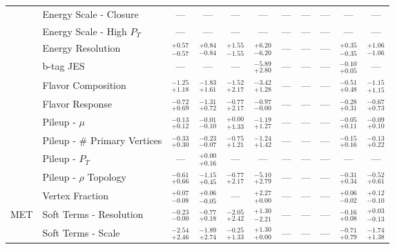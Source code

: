 \begin{tabular}{|cl||ccccccc|c||c|}
\cline{2-11}
&Energy Scale - Closure  & --- & --- & --- & --- & --- & --- & --- & --- & ---\\ 
\cline{2-11}
&Energy Scale - High $P_{T}$ & --- & --- & --- & --- & --- & --- & --- & --- & ---\\ 
\cline{2-11}
&Energy Resolution &  $^{+0.57}_{-0.57}$  &  $^{+0.84}_{-0.84}$  &  $^{+1.55}_{-1.55}$  &  $^{+6.20}_{-6.20}$  & --- & --- & --- &  $^{+0.35}_{-0.35}$  &  $^{+1.06}_{-1.06}$ \\ 
\cline{2-11}
&b-tag JES & --- & --- & --- &  $^{-5.89}_{+2.80}$  & --- & --- & --- &  $^{-0.10}_{+0.05}$  & ---\\ 
\cline{2-11}
&Flavor Composition &  $^{-1.25}_{+1.18}$  &  $^{-1.83}_{+1.61}$  &  $^{-1.52}_{+2.17}$  &  $^{-3.42}_{+1.28}$  & --- & --- & --- &  $^{-0.51}_{+0.48}$  &  $^{-1.15}_{+1.15}$ \\ 
\cline{2-11}
&Flavor Response &  $^{-0.72}_{+0.69}$  &  $^{-1.31}_{+0.72}$  &  $^{-0.77}_{+2.17}$  &  $^{-0.97}_{-0.00}$  & --- & --- & --- &  $^{-0.28}_{+0.31}$  &  $^{-0.67}_{+0.73}$ \\ 
\cline{2-11}
&Pileup - $\mu$ &  $^{-0.13}_{+0.12}$  &  $^{-0.01}_{-0.10}$  &  $^{+0.00}_{+1.33}$  &  $^{-1.19}_{+1.27}$  & --- & --- & --- &  $^{-0.05}_{+0.11}$  &  $^{-0.09}_{+0.10}$ \\ 
\cline{2-11}
&Pileup - \# Primary Vertices &  $^{-0.33}_{+0.30}$  &  $^{-0.23}_{-0.07}$  &  $^{-0.75}_{+1.21}$  &  $^{-1.24}_{+1.42}$  & --- & --- & --- &  $^{-0.15}_{+0.16}$  &  $^{-0.13}_{+0.22}$ \\ 
\cline{2-11}
&Pileup -  $P_{T}$ & --- &  $^{+0.00}_{+0.16}$  & --- & --- & --- & --- & --- & --- & ---\\ 
\cline{2-11}
&Pileup - $\rho$ Topology &  $^{-0.61}_{+0.66}$  &  $^{-1.15}_{+0.45}$  &  $^{-0.77}_{+2.17}$  &  $^{-5.10}_{+2.79}$  & --- & --- & --- &  $^{-0.31}_{+0.34}$  &  $^{-0.52}_{+0.61}$ \\ 
\cline{2-11}
&Vertex Fraction &  $^{+0.07}_{-0.08}$  &  $^{+0.06}_{-0.05}$  & --- &  $^{+2.27}_{+0.00}$  & --- & --- & --- &  $^{+0.06}_{-0.02}$  &  $^{+0.12}_{-0.10}$ \\ 
\hline
\multirow{2}{*}{MET}
&Soft Terms - Resolution &  $^{-0.23}_{-0.00}$  &  $^{-0.77}_{+0.18}$  &  $^{-2.05}_{+2.42}$  &  $^{+1.30}_{-2.21}$  & --- & --- & --- &  $^{-0.16}_{+0.08}$  &  $^{+0.03}_{-0.13}$ \\ 
\cline{2-11}
&Soft Terms - Scale &  $^{-2.54}_{+2.46}$  &  $^{-1.89}_{+2.74}$  &  $^{-0.25}_{+1.33}$  &  $^{+1.30}_{+0.00}$  & --- & --- & --- &  $^{-0.71}_{+0.79}$  &  $^{-1.74}_{+1.38}$ \\ 

\end{tabular}
